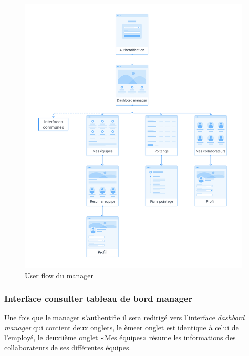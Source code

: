 \begin{figure}[h!]
    \vspace{-10pt}
    \centering
    \includegraphics[scale=0.38 ]{images/interface/Espace manager.png}
    \vspace{-30pt}
    \caption{User flow du manager}
    \label{fig95}
\end{figure}

\clearpage

\subsubsection*{Interface consulter tableau de bord manager}
Une fois que le manager s'authentifie il sera redirigé vers l’interface
\emph{dashbord manager} qui contient deux onglets, le èmeer onglet est identique
à celui de l’employé, le deuxiième onglet «Mes équipes» résume les informations
des collaborateurs de ses différentes équipes. 

